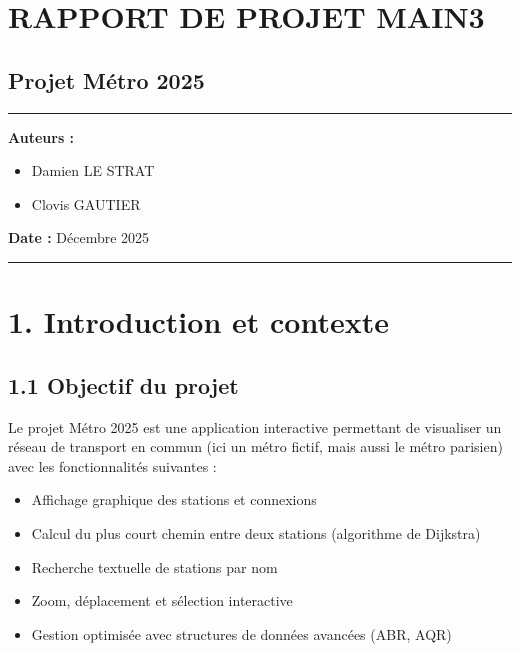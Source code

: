 \documentclass[
]{article}
\author{}
\date{}
\providecommand{\tightlist}{%
  \setlength{\itemsep}{0pt}\setlength{\parskip}{0pt}}
\begin{document}
\newpage

\section{RAPPORT DE PROJET MAIN3}\label{rapport-de-projet-main3}

\subsection{Projet Métro 2025}\label{projet-muxe9tro-2025}

\begin{center}\rule{0.5\linewidth}{0.5pt}\end{center}

\textbf{Auteurs :}

\begin{itemize}
\tightlist
\item
  Damien LE STRAT
\item
  Clovis GAUTIER
\end{itemize}

\textbf{Date :} Décembre 2025

\begin{center}\rule{0.5\linewidth}{0.5pt}\end{center}

\section{1. Introduction et contexte}\label{introduction-et-contexte}

\subsection{1.1 Objectif du projet}\label{objectif-du-projet}

Le projet Métro 2025 est une application interactive permettant de
visualiser un réseau de transport en commun (ici un métro fictif, mais
aussi le métro parisien) avec les fonctionnalités suivantes :

\begin{itemize}
\tightlist
\item
  Affichage graphique des stations et connexions
\item
  Calcul du plus court chemin entre deux stations (algorithme de
  Dijkstra)
\item
  Recherche textuelle de stations par nom
\item
  Zoom, déplacement et sélection interactive
\item
  Gestion optimisée avec structures de données avancées (ABR, AQR)
\end{itemize}
\end{document}
